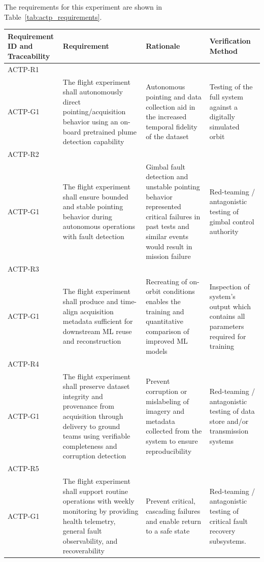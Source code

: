 \documentclass[conf]{new-aiaa}
\begin{document}
The requirements for this experiment are shown in Table~\ref{tab:actp_requirements}.

\begin{table}[H]
    \centering
    \footnotesize
    \setlength{\tabcolsep}{4pt}
    \renewcommand{\arraystretch}{1.15}
    \begin{tabularx}{\textwidth}{@{}>{\raggedright\arraybackslash}m{2.4cm}YYY@{}}
    \toprule
    \textbf{Requirement ID and Traceability} & \textbf{Requirement} & \textbf{Rationale} & \textbf{Verification Method} \\
    \midrule
    ACTP-R1\\ACTP-G1 &
    The flight experiment shall autonomously direct pointing/acquisition behavior using an on-board pretrained plume detection capability &
    Autonomous pointing and data collection aid in the increased temporal fidelity of the dataset &
    Testing of the full system against a digitally simulated orbit \\ \hline

    ACTP-R2\\ACTP-G1 &
    The flight experiment shall ensure bounded and stable pointing behavior during autonomous operations with fault detection &
    Gimbal fault detection and unstable pointing behavior represented critical failures in past tests and similar events would result in mission failure &
    Red-teaming / antagonistic testing of gimbal control authority \\ \hline

    ACTP-R3\\ACTP-G1 &
    The flight experiment shall produce and time-align acquisition metadata sufficient for downstream ML reuse and reconstruction &
    Recreating of on-orbit conditions enables the training and quantitative comparison of improved ML models &
    Inspection of system's output which contains all parameters required for training \\ \hline

    ACTP-R4\\ACTP-G1 &
    The flight experiment shall preserve dataset integrity and provenance from acquisition through delivery to ground teams using verifiable completeness and corruption detection &
    Prevent corruption or mislabeling of imagery and metadata collected from the system to ensure reproducibility &
    Red-teaming / antagonistic testing of data store and/or transmission systems \\ \hline

    ACTP-R5\\ACTP-G1 &
    The flight experiment shall support routine operations with weekly monitoring by providing health telemetry, general fault observability, and recoverability &
    Prevent critical, cascading failures and enable return to a safe state &
    Red-teaming / antagonistic testing of critical fault recovery subsystems. \\ \hline


\end{tabularx}
\end{table}
\end{document}
